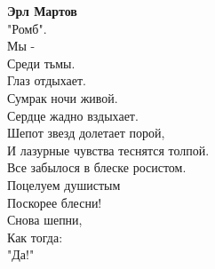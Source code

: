 \documentclass{article}
\newenvironment{myquotation}%
	{\begin{center}\begin{itshape}}%
	{\end{itshape}\end{center}}
\begin{document}
	\begin{myquotation}
		{\bf Эрл Мартов}\\
		"Ромб".\\
		Мы -\\
		Среди тьмы.\\
		Глаз отдыхает.\\
		Сумрак ночи живой.\\
		Сердце жадно вздыхает.\\
		Шепот звезд долетает порой,\\
		И лазурные чувства теснятся толпой.\\
		Все забылося в блеске росистом.\\
		Поцелуем  душистым\\
		Поскорее блесни!\\
		Снова шепни,\\
		Как тогда:\\
		"Да!"
	\end{myquotation}
\end{document}
